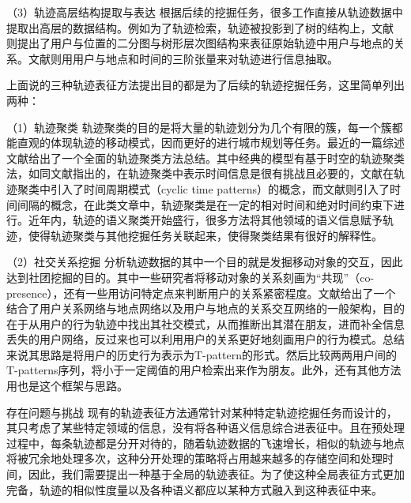 （3）轨迹高层结构提取与表达
根据后续的挖掘任务，很多工作直接从轨迹数据中提取出高层的数据结构。例如为了轨迹检索，轨迹被投影到了树的结构上\cite{guttman1984r,wang2008flexible,pfoser2000novel}，文献\cite{zheng2009mining} 则提出了用户与位置的二分图与树形层次图结构来表征原始轨迹中用户与地点的关系。文献\cite{yuan2015discovering,wang2014travel,liu2016unified}则用用户与地点和时间的三阶张量来对轨迹进行信息抽取。

上面说的三种轨迹表征方法提出目的都是为了后续的轨迹挖掘任务，这里简单列出两种：

（1）轨迹聚类
轨迹聚类的目的是将大量的轨迹划分为几个有限的簇，每一个簇都能直观的体现轨迹的移动模式，因而更好的进行城市规划等任务。最近的一篇综述文献\cite{yuan2017review}给出了一个全面的轨迹聚类方法总结。其中经典的模型有基于时空的轨迹聚类法，如同文献\cite{kisilevich2009spatio}指出的，在轨迹聚类中表示时间信息是很有挑战且必要的，文献\cite{birant2007st}在轨迹聚类中引入了时间周期模式（cyclic time patterns）的概念，而文献\cite{nanni2006time}则引入了时间间隔的概念，在此类文章中，轨迹聚类是在一定的相对时间和绝对时间约束下进行。近年内，轨迹的语义聚类开始盛行，很多方法\cite{yan2013semantic,palma2008clustering,zheng2008understanding,ying2011semantic}将其他领域的语义信息赋予轨迹，使得轨迹聚类与其他挖掘任务关联起来，使得聚类结果有很好的解释性。

（2）社交关系挖掘
分析轨迹数据的其中一个目的就是发掘移动对象的交互，因此达到社团挖掘的目的。其中一些研究者将移动对象的关系刻画为“共现”（co-presence）\cite{crandall2010inferring}，还有一些用访问特定点来判断用户的关系紧密程度\cite{wang2011human,gaito2011mobility}。文献\cite{li2008mining}给出了一个结合了用户关系网络与地点网络以及用户与地点的关系交互网络的一般架构，目的在于从用户的行为轨迹中找出其社交模式，从而推断出其潜在朋友，进而补全信息丢失的用户网络，反过来也可以利用用户的关系更好地刻画用户的行为模式\cite{zheng2011recommending}。总结来说其思路是将用户的历史行为表示为T-pattern\cite{giannotti2007trajectory}的形式。然后比较两两用户间的T-patterns序列，将小于一定阈值的用户检索出来作为朋友。此外，还有其他方法\cite{xiao2010finding,zheng2011recommending}用也是这个框架与思路。

存在问题与挑战
现有的轨迹表征方法通常针对某种特定轨迹挖掘任务而设计的，其只考虑了某些特定领域的信息，没有将各种语义信息综合进表征中。且在预处理过程中，每条轨迹都是分开对待的，随着轨迹数据的飞速增长，相似的轨迹与地点将被冗余地处理多次，这种分开处理的策略将占用越来越多的存储空间和处理时间，因此，我们需要提出一种基于全局的轨迹表征。为了使这种全局表征方式更加完备，轨迹的相似性度量以及各种语义都应以某种方式融入到这种表征中来。

